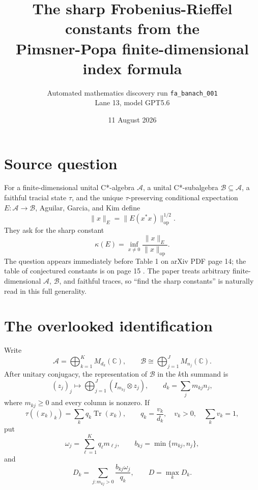 \documentclass[10pt]{article}
\title{The sharp Frobenius-Rieffel constants from the\\
Pimsner-Popa finite-dimensional index formula}
\author{Automated mathematics discovery run \texttt{fa\_banach\_001}\\
Lane 13, model GPT5.6}
\date{11 August 2026}
\newcommand{\A}{\mathcal A}
\newcommand{\B}{\mathcal B}
\newcommand{\C}{\mathbb C}
\newcommand{\op}{\mathrm{op}}
\newcommand{\Tr}{\operatorname{Tr}}
\begin{document}
\maketitle

\begin{center}
\end{center}

\section{Source question}

For a finite-dimensional unital C*-algebra $\A$, a unital C*-subalgebra
$\B\subseteq\A$, a faithful tracial state $\tau$, and the unique
$\tau$-preserving conditional expectation $E:\A\to\B$, Aguilar, Garcia, and
Kim define
\[
   \|x\|_{E}=\|E(x^*x)\|_{\op}^{1/2}.
\]
They ask for the sharp constant
\[
 \kappa(E)=\inf_{x\ne0}\frac{\|x\|_E}{\|x\|_{\op}}.             \tag{1}
\]
The question appears immediately before Table 1 on arXiv PDF page 14; the
table of conjectured constants is on page 15 \cite{AGK}.  The paper treats
arbitrary finite-dimensional $\A$, $\B$, and faithful traces, so ``find the
sharp constants'' is naturally read in this full generality.

\section{The overlooked identification}

Write
\[
 \A=\bigoplus_{k=1}^{K}M_{d_k}(\C),\qquad
 \B\cong\bigoplus_{j=1}^{J}M_{n_j}(\C).
\]
After unitary conjugacy, the representation of $\B$ in the $k$th summand is
\[
 (z_j)_j\longmapsto\bigoplus_{j=1}^{J}
       (I_{m_{kj}}\otimes z_j),
 \qquad d_k=\sum_jm_{kj}n_j,                                  \tag{2}
\]
where $m_{kj}\ge0$ and every column is nonzero.  If
\[
 \tau((x_k)_k)=\sum_k q_k\Tr(x_k),\qquad q_k=\frac{v_k}{d_k},
 \quad v_k>0,\quad\sum_kv_k=1,
\]
put
\[
 \omega_j=\sum_{\ell=1}^{K}q_\ell m_{\ell j},\qquad
 b_{kj}=\min\{m_{kj},n_j\},
\]
and
\[
 D_k=\sum_{j:m_{kj}>0}\frac{b_{kj}\omega_j}{q_k},
 \qquad D=\max_kD_k.                                         \tag{3}
\]
\end{document}
